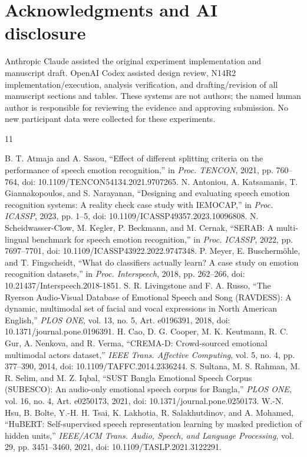 \documentclass[letterpaper]{article}
\begin{document}
\section{Acknowledgments and AI disclosure}
Anthropic Claude assisted the original experiment implementation and manuscript draft. OpenAI Codex assisted design review, N14R2 implementation/execution, analysis verification, and drafting/revision of all manuscript sections and tables. These systems are not authors; the named human author is responsible for reviewing the evidence and approving submission. No new participant data were collected for these experiments.

\clearpage
\begin{thebibliography}{11}
\raggedright
{} B. T. Atmaja and A. Sasou, ``Effect of different splitting criteria on the performance of speech emotion recognition,'' in \emph{Proc. TENCON}, 2021, pp. 760--764, doi: 10.1109/TENCON54134.2021.9707265.
 N. Antoniou, A. Katsamanis, T. Giannakopoulos, and S. Narayanan, ``Designing and evaluating speech emotion recognition systems: A reality check case study with IEMOCAP,'' in \emph{Proc. ICASSP}, 2023, pp. 1--5, doi: 10.1109/ICASSP49357.2023.10096808.
 N. Scheidwasser-Clow, M. Kegler, P. Beckmann, and M. Cernak, ``SERAB: A multi-lingual benchmark for speech emotion recognition,'' in \emph{Proc. ICASSP}, 2022, pp. 7697--7701, doi: 10.1109/ICASSP43922.2022.9747348.
 P. Meyer, E. Buscherm{\"o}hle, and T. Fingscheidt, ``What do classifiers actually learn? A case study on emotion recognition datasets,'' in \emph{Proc. Interspeech}, 2018, pp. 262--266, doi: 10.21437/Interspeech.2018-1851.
 S. R. Livingstone and F. A. Russo, ``The Ryerson Audio-Visual Database of Emotional Speech and Song (RAVDESS): A dynamic, multimodal set of facial and vocal expressions in North American English,'' \emph{PLOS ONE}, vol. 13, no. 5, Art. e0196391, 2018, doi: 10.1371/journal.pone.0196391.
 H. Cao, D. G. Cooper, M. K. Keutmann, R. C. Gur, A. Nenkova, and R. Verma, ``CREMA-D: Crowd-sourced emotional multimodal actors dataset,'' \emph{IEEE Trans. Affective Computing}, vol. 5, no. 4, pp. 377--390, 2014, doi: 10.1109/TAFFC.2014.2336244.
 S. Sultana, M. S. Rahman, M. R. Selim, and M. Z. Iqbal, ``SUST Bangla Emotional Speech Corpus (SUBESCO): An audio-only emotional speech corpus for Bangla,'' \emph{PLOS ONE}, vol. 16, no. 4, Art. e0250173, 2021, doi: 10.1371/journal.pone.0250173.
 W.-N. Hsu, B. Bolte, Y.-H. H. Tsai, K. Lakhotia, R. Salakhutdinov, and A. Mohamed, ``HuBERT: Self-supervised speech representation learning by masked prediction of hidden units,'' \emph{IEEE/ACM Trans. Audio, Speech, and Language Processing}, vol. 29, pp. 3451--3460, 2021, doi: 10.1109/TASLP.2021.3122291.

\end{thebibliography}
\end{document}
